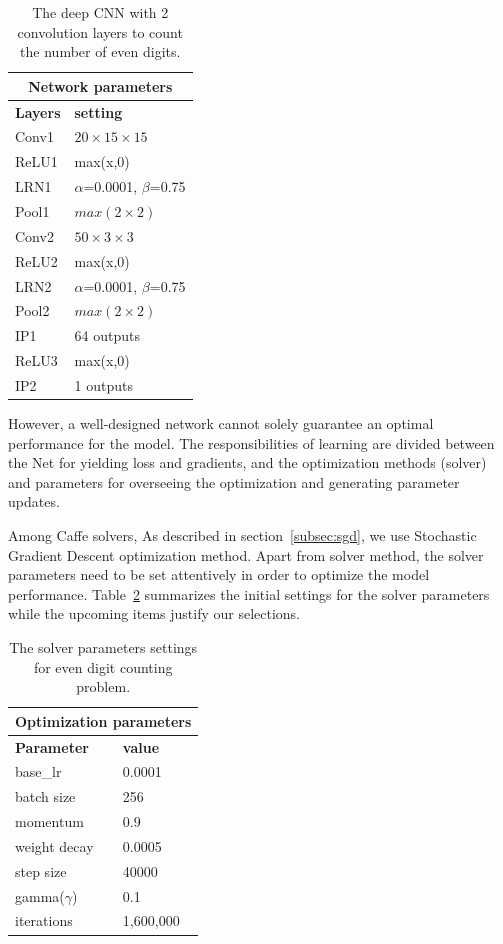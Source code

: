 \begin{table}[H]
	\centering
	\begin{tabular}{ |p{2cm}|p{2cm}| }
	\hline 
	\multicolumn{2}{|c|}{\textbf{Network parameters}} \\
	\hline
	\hline
	\textbf{Layers} & \textbf{setting }\\
	\hline
	Conv1 & $20\times15\times15$\\
	\hline
	ReLU1 & max(x,0)  \\
	\hline
	LRN1 & $\alpha$=0.0001, $\beta$=0.75\\
	\hline
	Pool1    & $max(2\times2)$ \\
	\hline
	Conv2 & $50\times3\times3$\\
	\hline
	ReLU2 & max(x,0)  \\
	\hline
	LRN2 & $\alpha$=0.0001, $\beta$=0.75\\
	\hline
	Pool2    & $max(2\times2)$ \\
	\hline
	IP1 & 64 outputs \\
	\hline
	ReLU3 & max(x,0)  \\
	\hline
	IP2 & 1 outputs \\
	\hline
	\end{tabular}
		\caption{The deep CNN with 2 convolution layers to count the number of even digits.}
		\label{fig:digitnet}
\end{table}




However, a well-designed network cannot solely guarantee an optimal performance for the model. The responsibilities of learning are divided between the Net for yielding loss and gradients, and the optimization methods (solver) and parameters for overseeing the optimization and generating parameter updates. 

Among Caffe solvers, As described in section~\ref{subsec:sgd}, we use Stochastic Gradient Descent optimization method. Apart from solver method, the solver parameters need to be set attentively in order to optimize the model performance. Table~\ref{tab:digitsolver} summarizes the initial settings for the solver parameters while the upcoming items justify our selections.

\begin{table}[H]
	\centering
	\begin{tabular}{ |p{2cm}|p{2cm}| }
	\hline 
	\multicolumn{2}{|c|}{\textbf{Optimization parameters}} \\
	\hline
	\hline
	\textbf{Parameter} & \textbf{value}\\
	\hline
	base\_lr & 0.0001\\
	\hline
	batch size & 256\\
	\hline
	momentum & 0.9  \\
	\hline
	weight decay & 0.0005\\
	\hline
	step size   & 40000 \\
	\hline
	gamma($\gamma$) & 0.1\\
	\hline
	iterations & 1,600,000\\
	\hline
	\end{tabular}
		\caption{The solver parameters settings for even digit counting problem.}
		\label{tab:digitsolver}
\end{table}


